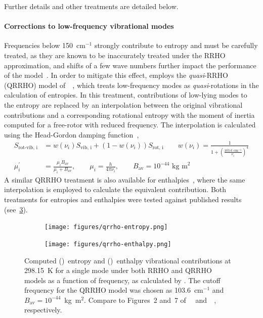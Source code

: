 Further details and other treatments are detailed below.

\paragraph{Corrections to low-frequency vibrational modes}

Frequencies below 150~cm$^{-1}$ strongly contribute to entropy and must be carefully treated,
as they are known to be inaccurately treated under the RRHO approximation,
and shifts of a few wave numbers further impact the performance of the model~\cite{Ribeiro_2011,Grimme_2012,Jensen_2015,Ryu_2018}.
In order to mitigate this effect,
\overreact employs the \emph{quasi}-RRHO (QRRHO) model of~\citeauthor{Grimme_2012}~\cite{Grimme_2012},
which treats low-frequency modes as \emph{quasi}-rotations in the calculation of entropies.
In this treatment,
contributions of low-lying modes to the entropy are replaced by an interpolation between the original vibrational contributions and a corresponding rotational entropy with the moment of inertia computed for a free-rotor with reduced frequency.
The interpolation is calculated using the Head-Gordon damping function~\cite{Chai_2008},
% 
\begin{equation}
	\begin{split}
		S_\text{rot-vib,
			i}
		&= w(\nu_i) S_\text{vib,
			i}
		+ \left(
		1 - w(\nu_i)
		\right) S_\text{rot,
			i}
		\qquad
		w(\nu_i) = \frac{1}{
			1 + \left(
			\frac{
				103.6 \text{ cm}^{-1}
			}{\nu_i}
			\right)^4
		} \\
		\mu^\prime_i &= \frac{\mu_i B_\text{av}}{\mu_i + B_\text{av}},
		\qquad
		\mu_i = \frac{h}{4 \pi \nu_i},
		\qquad
		B_\text{av} = 10^{-44} \text{ kg m}^2
	\end{split}
\end{equation}
% 
A similar QRRHO treatment is also available for enthalpies~\cite{Li_2015},
where the same interpolation is employed to calculate the equivalent contribution.
Both treatments for entropies and enthalpies were tested against published results (see~\cref{fig:qrrho}).
% 
\begin{figure}[hbtp]
	\centering
	\begin{subfigure}[c]{0.5\textwidth}
		\centering
		\texttt{[image: figures/qrrho-entropy.png]}
		\caption{}\label{fig:qrrho-entropy}
	\end{subfigure}%
	\begin{subfigure}[c]{0.5\textwidth}
		\centering
		\texttt{[image: figures/qrrho-enthalpy.png]}
		\caption{}\label{fig:qrrho-enthalpy}
	\end{subfigure}%
	\caption{Computed ()~entropy and ()~enthalpy vibrational contributions at 298.15~K for a single mode under both RRHO and QRRHO~\cite{Grimme_2012,Li_2015} models as a function of frequency,
		as calculated by \overreact.
		The cutoff frequency for the QRRHO model was chosen as 103.6~cm$^{-1}$ and $B_\text{av} = 10^{-44}$~kg~m$^2$.
		Compare to Figures~2 and~7 of~\citeauthor{Grimme_2012}~\cite{Grimme_2012} and~\citeauthor{Li_2015}~\cite{Li_2015},
		respectively.}\label{fig:qrrho}
\end{figure}
